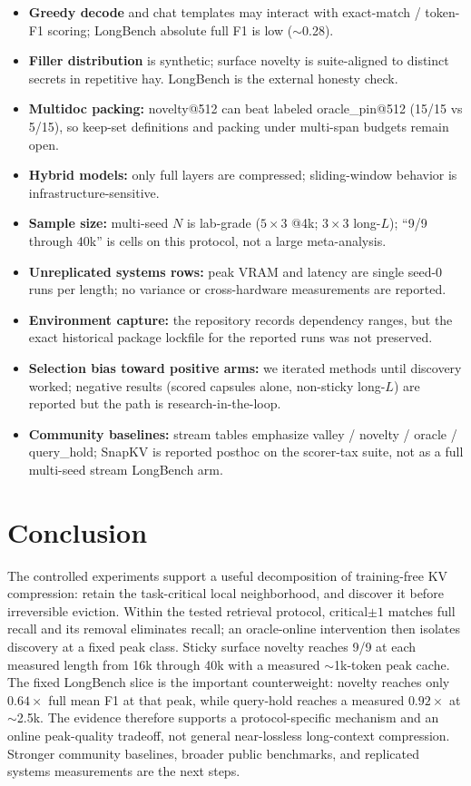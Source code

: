 \documentclass[11pt,a4paper]{article}
\begin{document}
\begin{itemize}[leftmargin=*,itemsep=2pt]
  \item \textbf{Greedy decode} and chat templates may interact with exact-match / token-F1 scoring; LongBench absolute full F1 is low ($\sim$0.28).
  \item \textbf{Filler distribution} is synthetic; surface novelty is suite-aligned to distinct secrets in repetitive hay. LongBench is the external honesty check.
  \item \textbf{Multidoc packing:} novelty@512 can beat labeled oracle\_pin@512 (15/15 vs 5/15), so keep-set definitions and packing under multi-span budgets remain open.
  \item \textbf{Hybrid models:} only full layers are compressed; sliding-window behavior is infrastructure-sensitive.
  \item \textbf{Sample size:} multi-seed $N$ is lab-grade ($5\times3$ @4k; $3\times3$ long-$L$); ``9/9 through 40k'' is cells on this protocol, not a large meta-analysis.
  \item \textbf{Unreplicated systems rows:} peak VRAM and latency are single seed-0 runs per length; no variance or cross-hardware measurements are reported.
  \item \textbf{Environment capture:} the repository records dependency ranges, but the exact historical package lockfile for the reported runs was not preserved.
  \item \textbf{Selection bias toward positive arms:} we iterated methods until discovery worked; negative results (scored capsules alone, non-sticky long-$L$) are reported but the path is research-in-the-loop.
  \item \textbf{Community baselines:} stream tables emphasize valley / novelty / oracle / query\_hold; SnapKV is reported posthoc on the scorer-tax suite, not as a full multi-seed stream LongBench arm.
\end{itemize}

\section{Conclusion}

The controlled experiments support a useful decomposition of training-free KV compression: retain the task-critical local neighborhood, and discover it before irreversible eviction. Within the tested retrieval protocol, critical$\pm1$ matches full recall and its removal eliminates recall; an oracle-online intervention then isolates discovery at a fixed peak class. Sticky surface novelty reaches 9/9 at each measured length from 16k through 40k with a measured $\sim$1k-token peak cache. The fixed LongBench slice is the important counterweight: novelty reaches only $0.64\times$ full mean F1 at that peak, while query-hold reaches a measured $0.92\times$ at $\sim$2.5k. The evidence therefore supports a protocol-specific mechanism and an online peak-quality tradeoff, not general near-lossless long-context compression. Stronger community baselines, broader public benchmarks, and replicated systems measurements are the next steps.
\end{document}
